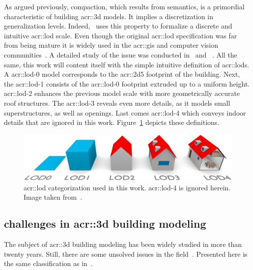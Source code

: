             As argued previously, compaction, which results from semantics, is a primordial characteristic of building \gls{acr::3d} models.
            It implies a discretization in generalization levels.
            Indeed,~\textcite{groger2012citygml} uses this property to formalize a discrete and intuitive \gls{acr::lod} scale.
            Even though the original \gls{acr::lod} specification was far from being mature it is widely used in the \gls{acr::gis} and computer vision communities~\parencite{rau2006lod,biljecki2014formalisation}.
            A detailed study of the issue was conducted in~\textcite{biljecki2014formalisation} and ~\textcite{biljecki2016improved}.
            All the same, this work will content itself with the simple intuitive definition of \glspl{acr::lod}.\\
            A \gls*{acr::lod}-0 model corresponds to the \gls{acr::2d5} footprint of the building.
            Next, the \gls*{acr::lod}-1 consists of the \gls*{acr::lod}-0 footprint extruded up to a uniform height.
            \gls*{acr::lod}-2 enhances the previous model scale with more geometrically accurate roof structures.
            The \gls*{acr::lod}-3 reveals even more details, as it models small superstructures, as well as openings.
            Last comes \gls*{acr::lod}-4 which conveys indoor details that are ignored in this work.
            Figure~\ref{fig::lods} depicts these definitions.\\

            \begin{figure}[htpb]
                \centering
                \includegraphics[width=.7\textwidth]{images/introduction/lods}            
                \caption[
                    \acrshort*{acr::lod} categorization used in this work.
                ]{
                    \label{fig::lods}
                    \gls{acr::lod} categorization used in this work.
                    \gls{acr::lod}-4 is ignored herein.
                    Image taken from~\parencite{biljecki2016improved}.
                }
            \end{figure}
    \subsection{challenges in \texorpdfstring{\gls*{acr::3d}}{3D} building modeling}
        \label{subsec::introduction::urban_3d_reconstruction::challenges}
        The subject of \gls{acr::3d} building modeling has been widely studied in more than twenty years.
        Still, there are some unsolved issues in the field~\parencite{musialski2013survey, lafarge2015some}.
        Presented here is the same classification as in~\textcite{lafarge2015some}.

